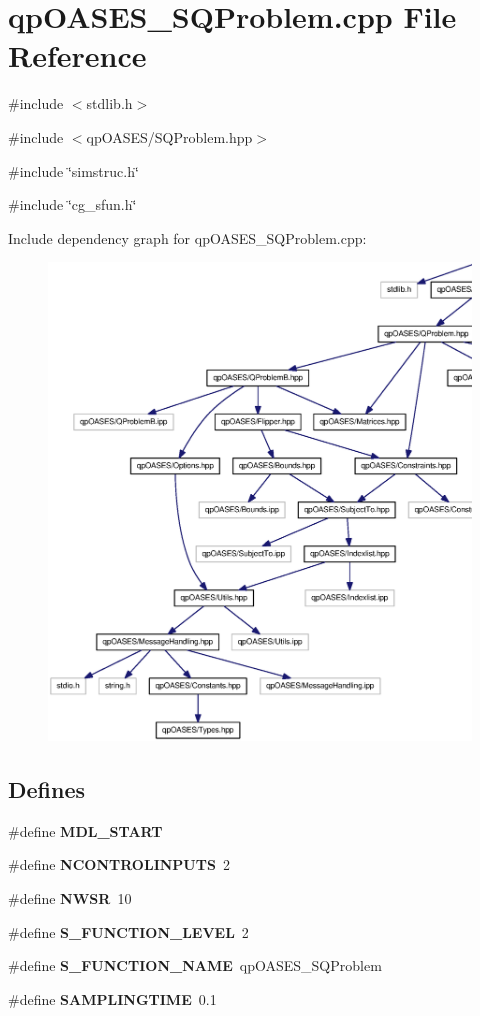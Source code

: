 \section{qpOASES\_\-SQProblem.cpp File Reference}
\label{qpOASES__SQProblem_8cpp}
{\ttfamily \#include $<$stdlib.h$>$}\par
{\ttfamily \#include $<$qpOASES/SQProblem.hpp$>$}\par
{\ttfamily \#include \char`\"{}simstruc.h\char`\"{}}\par
{\ttfamily \#include \char`\"{}cg\_\-sfun.h\char`\"{}}\par
Include dependency graph for qpOASES\_\-SQProblem.cpp:
\nopagebreak
\begin{figure}[H]
\begin{center}
\leavevmode
\includegraphics[width=400pt]{qpOASES__SQProblem_8cpp__incl}
\end{center}
\end{figure}
\subsection*{Defines}
\begin{DoxyCompactItemize}
\item 
\#define {\bf MDL\_\-START}
\item 
\#define {\bf NCONTROLINPUTS}~2
\item 
\#define {\bf NWSR}~10
\item 
\#define {\bf S\_\-FUNCTION\_\-LEVEL}~2
\item 
\#define {\bf S\_\-FUNCTION\_\-NAME}~qpOASES\_\-SQProblem
\item 
\#define {\bf SAMPLINGTIME}~0.1
\end{DoxyCompactItemize}

